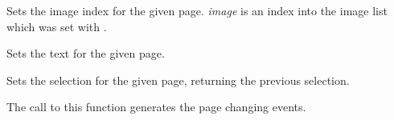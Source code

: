 Sets the image index for the given page. {\it image} is an index into
the image list which was set with .


\label{wxnotebooksetpagetext}


Sets the text for the given page.


\label{wxnotebooksetselection}


Sets the selection for the given page, returning the previous selection.

The call to this function generates the page changing events.




